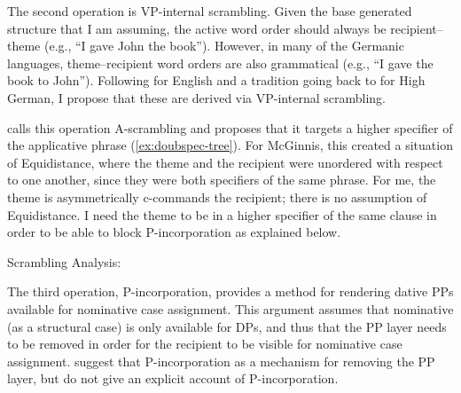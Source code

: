 The second operation is VP-internal scrambling. Given the base generated structure that I am assuming, the active word order should always be recipient--theme (e.g., ``I gave John the book''). However, in many of the Germanic languages, theme--recipient word orders are also grammatical (e.g., ``I gave the book to John''). Following \cite{Takano.1998} for English and a tradition going back to \cite{Lenerz.1977} for High German, I propose that these are derived via VP-internal scrambling.

\cite{McGinnis.1998} calls this operation A-scrambling and proposes that it targets a higher specifier of the applicative phrase (\ref{ex:doubspec-tree}). For McGinnis, this created a situation of Equidistance, where the theme and the recipient were unordered with respect to one another, since they were both specifiers of the same phrase. For me, the theme is asymmetrically c-commands the recipient; there is no assumption of Equidistance. I need the theme to be in a higher specifier of the same clause in order to be able to block P-incorporation as explained below. 

\begin{exe}
	\ex Scrambling Analysis:\label{ex:doubspec-tree}
 \end{exe} 

 The third operation, P-incorporation, provides a method for rendering dative PPs available for nominative case assignment. This argument assumes that nominative (as a structural case) is only available for DPs, and thus that the PP layer needs to be removed in order for the recipient to be visible for nominative case assignment. \cite{Alexiadou.2014} suggest that P-incorporation as a mechanism for removing the PP layer, but do not give an explicit account of P-incorporation.

